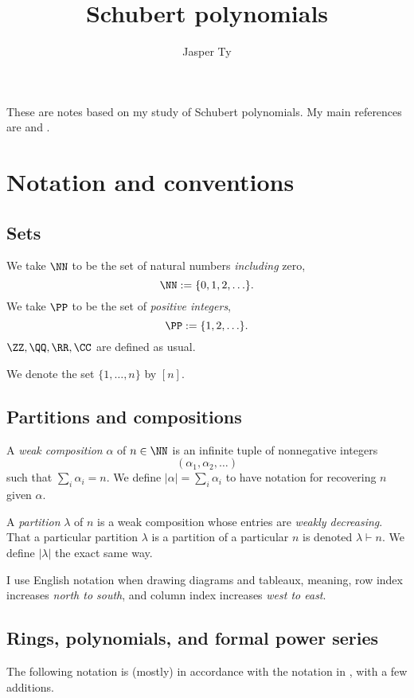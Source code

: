 \documentclass{article}
\title{Schubert polynomials}
\author{Jasper Ty}
\date{}
\begin{document}
\maketitle

These are notes based on my study of Schubert polynomials. My main references are \cite{MacdonaldSchubertPolynomials} and \cite{KnutsonSchubertPolynomials}.

\tableofcontents

\section{Notation and conventions}

\subsection{Sets}

We take $\NN$ to be the set of natural numbers \textit{including} zero,
\[
    \NN := \{0,1,2,\ldots\}.
\]
We take $\PP$ to be the set of \textit{positive integers},
\[
    \PP := \{1,2,\ldots\}.
\]
$\ZZ,\QQ,\RR,\CC$ are defined as usual.

We denote the set $\{1,\ldots,n\}$ by $[n]$.

\subsection{Partitions and compositions}

A \textit{weak composition} $\alpha$ of $n \in \NN$ is an infinite tuple of nonnegative integers 
\[
    (\alpha_1, \alpha_2, \ldots)
\]
such that $\sum_i \alpha_i = n$. 
We define $|\alpha| = \sum_i \alpha_i$ to have notation for recovering $n$ given $\alpha$.

A \textit{partition} $\lambda$ of $n$ is a weak composition whose entries are \textit{weakly decreasing}. 
That a particular partition $\lambda$ is a partition of a particular $n$ is denoted $\lambda \vdash n$. 
We define $|\lambda|$ the exact same way.

I use English notation when drawing diagrams and tableaux, meaning, row index increases \textit{north to south}, and column index increases \textit{west to east}.

\subsection{Rings, polynomials, and formal power series}

The following notation is (mostly) in accordance with the notation in \cite{DarijAC}, with a few additions. 
\end{document}
